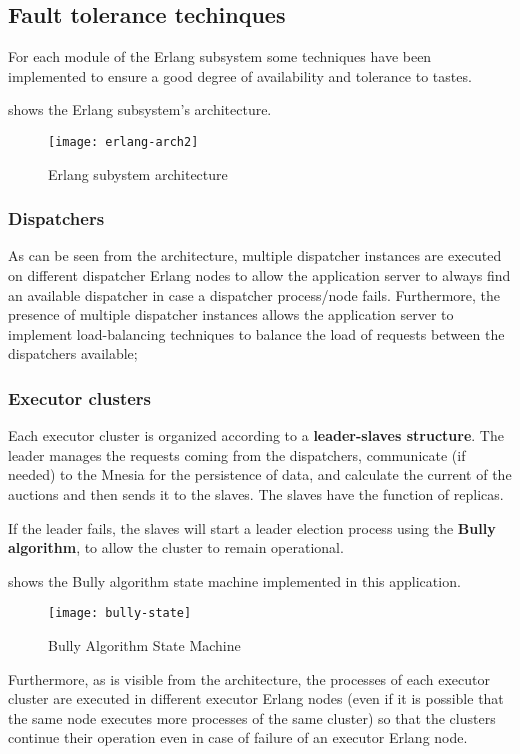 \subsection{Fault tolerance techinques}\label{subsec:archtolerance}

For each module of the Erlang subsystem some techniques have been implemented to
ensure a good degree of availability and tolerance to tastes.

 shows the Erlang subsystem's architecture.

\begin{figure}[htb]
	\centering
	\texttt{[image: erlang-arch2]}
	\caption{Erlang subystem architecture}\label{fig:erlang-arch2}
\end{figure}

\subsubsection{Dispatchers}

As can be seen from the architecture, multiple dispatcher instances are executed
on different dispatcher Erlang nodes to allow the application server to always
find an available dispatcher in case a dispatcher process/node fails.
Furthermore, the presence of multiple dispatcher instances allows the
application server to implement load-balancing techniques to balance the load of
requests between the dispatchers available;

\subsubsection{Executor clusters}

Each executor cluster is organized according to a \textbf{leader-slaves
structure}. The leader manages the requests coming from the dispatchers,
communicate (if needed) to the Mnesia for the persistence of data, and calculate
the current  of the auctions and then sends it to the slaves.
The slaves have the function of replicas.

If the leader fails, the slaves will start a leader election process using the
\textbf{Bully algorithm}, to allow the cluster to remain operational.

 shows the Bully algorithm state machine implemented in
this application.

\begin{figure}[htb]
	\centering
	\texttt{[image: bully-state]}
	\caption{Bully Algorithm State Machine}\label{fig:bully-state}
\end{figure}

Furthermore, as is visible from the architecture, the processes of each executor
cluster are executed in different executor Erlang nodes (even if it is possible
that the same node executes more processes of the same cluster) so that the
clusters continue their operation even in case of failure of an executor Erlang
node.
